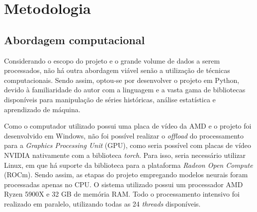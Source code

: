 \chapter{Metodologia}
\section{Abordagem computacional}

Considerando o escopo do projeto e o grande volume de dados a serem processados, não há outra abordagem viável senão
a utilização de técnicas computacionais. Sendo assim, optou-se por desenvolver o projeto em Python, devido à 
familiaridade do autor com a linguagem e a vasta gama de bibliotecas disponíveis para manipulação de séries históricas, 
análise estatística e aprendizado de máquina. 

Como o computador utilizado possui uma placa de vídeo da AMD e o projeto foi desenvolvido em Windows, não foi possível 
realizar o \textit{offload} do processamento para a \textit{Graphics Processing Unit} (GPU), como seria possível com placas 
de vídeo NVIDIA nativamente com a biblioteca \textit{torch}. Para isso, seria necessário utilizar Linux, em que há suporte da biblioteca para 
a plataforma \textit{Radeon Open Compute} (ROCm). Sendo assim, as etapas do projeto empregando modelos neurais foram 
processadas apenas no CPU. O sistema utilizado possui um processador AMD Ryzen 5900X e 32 GB de memória
RAM. Todo o processamento intensivo foi realizado em paralelo, utilizando todas as 24 \textit{threads} disponíveis.

